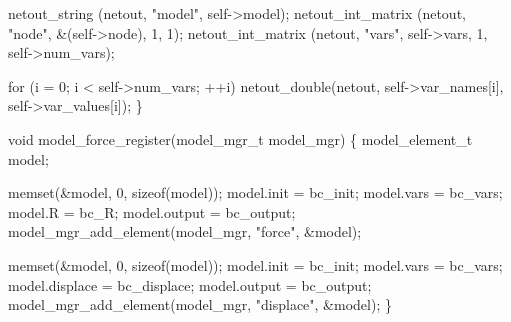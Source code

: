     netout_string     (netout, "model", self->model);
    netout_int_matrix (netout, "node",  &(self->node), 1, 1);
    netout_int_matrix (netout, "vars",  self->vars, 1, self->num_vars);

    for (i = 0; i < self->num_vars; ++i)
        netout_double(netout, self->var_names[i], self->var_values[i]);
\}

\nwendcode{}\nwdocspar

\nwenddocs{}\endmoddef
void model_force_register(model_mgr_t model_mgr)
\{
    model_element_t model;

    memset(&model, 0, sizeof(model));
    model.init     = bc_init;
    model.vars     = bc_vars;
    model.R        = bc_R;
    model.output   = bc_output;
    model_mgr_add_element(model_mgr, "force", &model);

    memset(&model, 0, sizeof(model));
    model.init     = bc_init;
    model.vars     = bc_vars;
    model.displace = bc_displace;
    model.output   = bc_output;
    model_mgr_add_element(model_mgr, "displace", &model);
\}

\nwendcode{}

%
%
%
%
%
%
%
\nwdocspar

\nwenddocs{}
